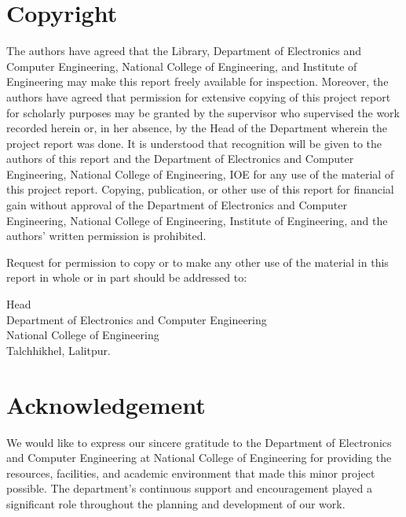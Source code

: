 \documentclass[12pt, a4paper]{report}
\numberwithin{equation}{chapter}
\begin{document}
\newpage

\chapter*{Copyright}
The authors have agreed that the Library, Department of Electronics and Computer Engineering, National College of Engineering, and Institute of Engineering may make this report freely available for inspection. Moreover, the authors have agreed that permission for extensive copying of this project report for scholarly purposes may be granted by the supervisor who supervised the work recorded herein or, in her absence, by the Head of the Department wherein the project report was done. It is understood that recognition will be given to the authors of this report and the Department of Electronics and Computer Engineering, National College of Engineering, IOE for any use of the material of this project report. Copying, publication, or other use of this report for financial gain without approval of the Department of Electronics and Computer Engineering, National College of Engineering, Institute of Engineering, and the authors' written permission is prohibited.

Request for permission to copy or to make any other use of the material in this report in whole or in part should be addressed to:

\vspace{0.5cm}
\noindent
Head\\
Department of Electronics and Computer Engineering\\
National College of Engineering\\
Talchhikhel, Lalitpur.

\newpage

\chapter*{Acknowledgement}


We would like to express our sincere gratitude to the Department of Electronics and Computer Engineering at National College of Engineering for providing the resources, facilities, and academic environment that made this minor project possible. The department's continuous support and encouragement played a significant role throughout the planning and development of our work.
\end{document}
